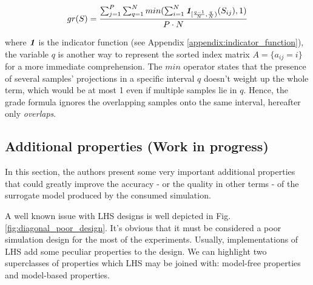 \documentclass[12pt]{extarticle}
\newcommand{\mfigref}[1]{Fig.\ref{#1}}
\newcommand{\mappendixref}[1]{Appendix \ref{#1}}
\newcommand{\indfunc}[1]{\textit{\textbf{1}}_{#1}}
\begin{document}
\begin{equation}
\label{eq:grade}
gr(S) = \frac{\sum^P_{j=1}\sum^N_{q=1} min(\sum^N_{i=1}\indfunc{[\frac{q-1}{N}, \frac{q}{N})}(S_{ij}), 1)}{P \cdot N}
\end{equation}

where $\indfunc{}$ is the indicator function (see \mappendixref{appendix:indicator_function}), the variable $q$ is another way to represent the sorted index matrix $A = \{a_{ij} = i \}$ for a more immediate comprehension. The $min$ operator states that the presence of several samples' projections in a specific interval $q$ doesn't weight up the whole term, which would be at most 1 even if multiple samples lie in $q$. Hence, the grade formula ignores the overlapping samples onto the same interval, hereafter only \textit{overlaps}.

\subsection{Additional properties (Work in progress)}
\label{subsec:lhs_properties}
In this section, the authors present some very important additional properties that could greatly improve the accuracy - or the quality in other terms - of the surrogate model produced by the consumed simulation.

A well known issue with LHS designs is well depicted in \mfigref{fig:diagonal_poor_design}. It's obvious that it must be considered a poor simulation design for the most of the experiments. Usually, implementations of LHS add some peculiar properties to the design. We can highlight two superclasses of properties which LHS may be joined with: model-free properties and model-based properties.
\end{document}
